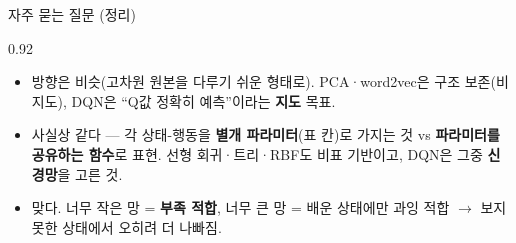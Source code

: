 \begin{frame}{자주 묻는 질문 (정리)}
\begin{center}\begin{varwidth}{0.92\textwidth}
  \begin{itemize}
    \item {} 방향은 비슷(고차원 원본을
      다루기 쉬운 형태로). PCA·word2vec은 구조 보존(비지도), DQN은
      ``Q값 정확히 예측''이라는 \textbf{지도} 목표.
    \item {} 사실상 같다 ---
      각 상태-행동을 \textbf{별개 파라미터}(표 칸)로 가지는 것 vs
      \textbf{파라미터를 공유하는 함수}로 표현. 선형 회귀·트리·RBF도
      비표 기반이고, DQN은 그중 \textbf{신경망}을 고른 것.
    \item {} 맞다. 너무 작은 망 =
      \textbf{부족 적합}, 너무 큰 망 = 배운 상태에만 과잉 적합 $\to$
      보지 못한 상태에서 오히려 더 나빠짐.
  \end{itemize}
\end{varwidth}\end{center}
\end{frame}
